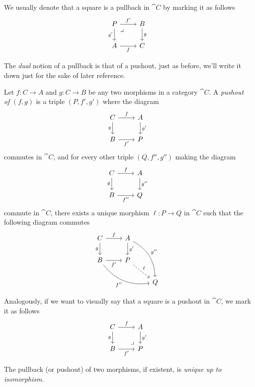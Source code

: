 We usually denote that a square is a pullback in \(\cat C\) by marking it as
follows
\[
\begin{tikzcd}
P \ar[r, "f'"] \ar[d, "g'"'] \ar[dr, phantom, "\lrcorner", very near start]
&B \ar[d, "g"]
\\
A \ar[r, "f"'] &C
\end{tikzcd}
\]

The \emph{dual} notion of a pullback is that of a pushout, just as before,
we'll write it down just for the sake of later reference.

\begin{definition}[Pushout]
\label{def:pushout}
Let \(f: C \to A\) and \(g: C \to B\) be any two morphisms in a category
\(\cat C\). A \emph{pushout of \((f, g)\)} is a triple \((P, f', g')\)
where the diagram
\[
\begin{tikzcd}
C \ar[r, "f"] \ar[d, "g"'] &A \ar[d, "g'"] \\
B \ar[r, "f'"'] &P
\end{tikzcd}
\]
commutes in \(\cat C\), and for every other triple \((Q, f'', g'')\) making the
diagram
\[
\begin{tikzcd}
C \ar[r, "f"] \ar[d, "g"'] &A \ar[d, "g''"] \\
B \ar[r, "f''"'] &Q
\end{tikzcd}
\]
commute in \(\cat C\), there exists a unique morphism \(\ell: P \to Q\) in
\(\cat C\) such that the following diagram commutes
\[
\begin{tikzcd}
C \ar[r, "f"] \ar[d, "g"']
&A \ar[d, "g'"] \ar[drd, bend left, "g''"]
&
\\
B \ar[r, "f'"'] \ar[rrd, bend right, "f''"']
&P \ar[dr, dashed, "\ell"]
&
\\
& &Q
\end{tikzcd}
\]
\end{definition}

Analogously, if we want to visually say that a square is a pushout in \(\cat
C\), we mark it as follows
\[
\begin{tikzcd}
C \ar[r, "f"] \ar[d, "g"'] &A \ar[d, "g'"] \\
B \ar[r, "f'"'] &P \ar[lu, phantom, "\lrcorner", very near start]
\end{tikzcd}
\]

\begin{proposition}[Uniqueness]
\label{prop:pullback-pushout-uniqueness}
The pullback (or pushout) of two morphisms, if existent, is \emph{unique up to
  isomorphism}.
\end{proposition}

